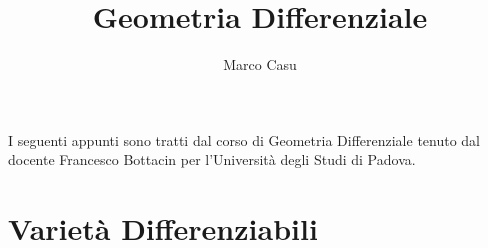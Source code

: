\documentclass[10pt, letterpaper]{report}
\title{Geometria Differenziale}
\author{Marco Casu}
\date{\vspace{-5ex}}
\begin{document}
\newpage
\pagecolor{cartaRiciclata}
\color{black}

\noindent I seguenti appunti sono tratti dal corso di Geometria Differenziale tenuto dal docente Francesco Bottacin per l'Università degli Studi di Padova.
\tableofcontents \newpage

\fancyhf{}
\fancyhead[L]{\nouppercase{\leftmark}}
\fancyfoot[C]{\thepage}
\newtheorem{definizione}{Definizione}
\newtheorem{teorema}{Teorema}
\newtheorem{esercizio}{Esercizio}
\newtheorem{congettura}{Congettura}
\newtheorem{lemma2}{Lemma}
\newtheorem{proposizione}{Proposizione}
\newtheorem{osservazione}{Osservazione}


\chapter{Varietà Differenziabili}
\end{document}

